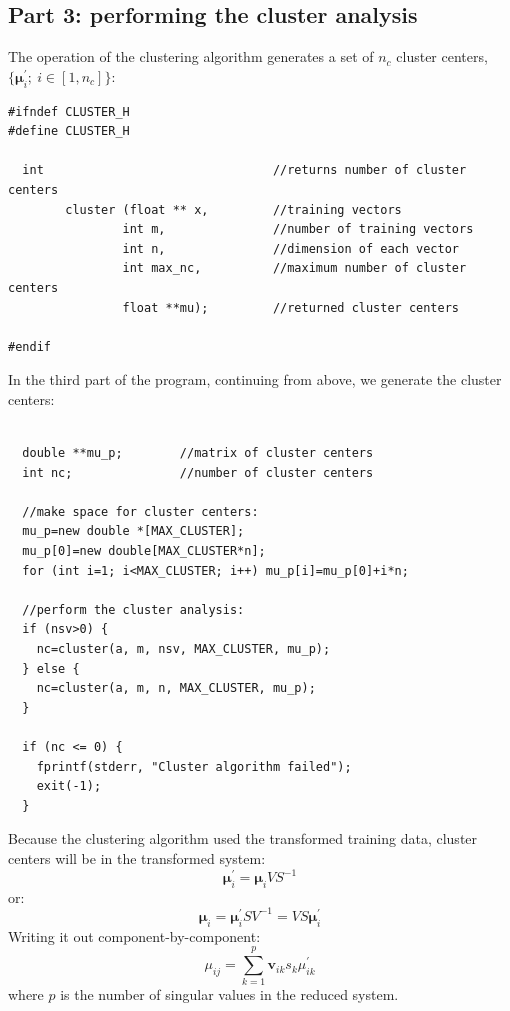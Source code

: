 \documentclass{article}
\renewcommand{\vec}[1]{\boldsymbol{#1}}
\begin{document}
\subsection{Part 3: performing the cluster analysis}

The operation of the clustering algorithm generates a set of $n_c$ cluster
centers, $\lbrace \vec \mu^\prime_i; ~i \in [1, n_c] \rbrace$:

\begin{verbatim}
#ifndef CLUSTER_H
#define CLUSTER_H

  int                                //returns number of cluster centers
        cluster (float ** x,         //training vectors
                int m,               //number of training vectors
                int n,               //dimension of each vector
                int max_nc,          //maximum number of cluster centers
                float **mu);         //returned cluster centers

#endif
\end{verbatim}

In the third part of the program, continuing from above, we generate the
cluster centers:

\begin{verbatim}

  double **mu_p;        //matrix of cluster centers
  int nc;               //number of cluster centers

  //make space for cluster centers:
  mu_p=new double *[MAX_CLUSTER];
  mu_p[0]=new double[MAX_CLUSTER*n];
  for (int i=1; i<MAX_CLUSTER; i++) mu_p[i]=mu_p[0]+i*n;

  //perform the cluster analysis:
  if (nsv>0) {
    nc=cluster(a, m, nsv, MAX_CLUSTER, mu_p);
  } else {
    nc=cluster(a, m, n, MAX_CLUSTER, mu_p);
  }

  if (nc <= 0) {
    fprintf(stderr, "Cluster algorithm failed");
    exit(-1);
  }

\end{verbatim}

Because the clustering algorithm used the transformed training data, 
cluster centers will be in the transformed system:
\begin{equation}
	\vec \mu^\prime_i = \vec \mu_i V S^{-1}
\end{equation}
or:
\begin{equation}
	\vec \mu_i = \vec \mu^\prime_i S V^{-1} = V S \vec \mu^\prime_i
	\label{untransform}
\end{equation}
Writing it out component-by-component:
\begin{equation}
	\mu_{ij} = \sum_{k=1}^p \vec v_{ik} s_k \mu_{ik}^\prime
	\label{untransform2}
\end{equation}
where $p$ is the number of singular values in the reduced system.
\end{document}
